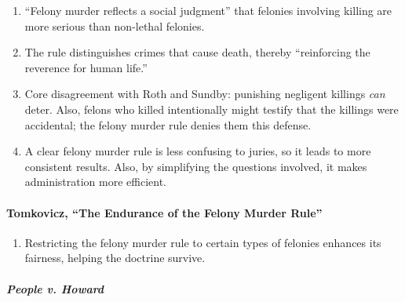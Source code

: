 \begin{enumerate}
    \item ``Felony murder reflects a social judgment'' that felonies involving killing are more serious than non-lethal felonies.
    \item The rule distinguishes crimes that cause death, thereby ``reinforcing the reverence for human life.''
    \item Core disagreement with Roth and Sundby: punishing negligent killings \emph{can} deter. Also, felons who killed intentionally might testify that the killings were accidental; the felony murder rule denies them this defense.
    \item A clear felony murder rule is less confusing to juries, so it leads to more consistent results. Also, by simplifying the questions involved, it makes administration more efficient.
\end{enumerate}

\paragraph{Tomkovicz, ``The Endurance of the Felony Murder Rule''}

\begin{enumerate}
    \item Restricting the felony murder rule to certain types of felonies enhances its fairness, helping the doctrine survive.
\end{enumerate}

\paragraph{\emph{People v. Howard}}

